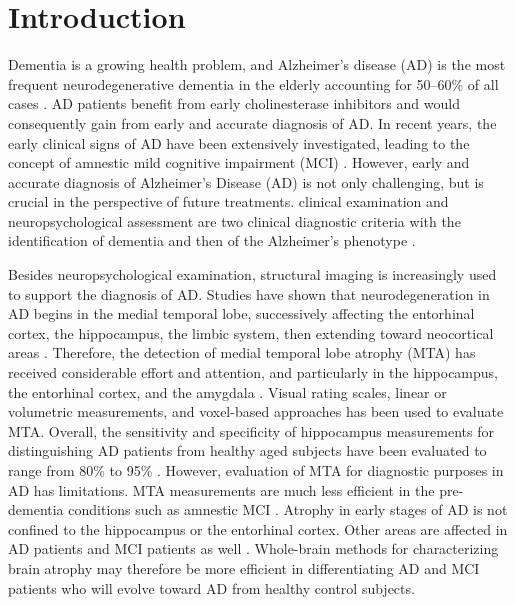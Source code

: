 
\section{Introduction}

Dementia is a growing health problem, and Alzheimer’s disease (AD) is the most frequent neurodegenerative dementia in the elderly accounting for 50–60\% of all cases \cite{brookmeyer1998projections,ferri2006global,ramaroson2003prevalence}. AD patients benefit from early cholinesterase inhibitors \cite{winblad1999assessing,dekosky2003looking} and would consequently gain from early and accurate diagnosis of AD. In recent years, the early clinical signs of AD have been extensively investigated, leading to the concept of amnestic
mild cognitive impairment (MCI) \cite{petersen2004mild,winblad2004mild}. However, early and accurate diagnosis of Alzheimer's Disease (AD) is not only challenging, but is crucial in the perspective of future treatments. clinical examination and neuropsychological assessment are two clinical diagnostic criteria with the identification of dementia and then of the Alzheimer's phenotype \cite{glodzik2012alzheimer}.

Besides neuropsychological examination, structural imaging is increasingly used to support the diagnosis of AD. Studies have shown that neurodegeneration in AD begins in the medial temporal lobe, successively affecting the entorhinal cortex, the hippocampus, the limbic system, then extending toward neocortical areas \cite{braak1995staging}. Therefore, the detection of medial temporal lobe atrophy (MTA) has received considerable effort and attention, and particularly in the hippocampus, the entorhinal cortex, and the amygdala \cite{leite2004pathological,glodzik2005role}. Visual rating scales, linear or volumetric measurements, and voxel-based approaches has been used to evaluate MTA. Overall, the sensitivity and specificity of hippocampus measurements for distinguishing AD patients from healthy aged subjects have been evaluated to range from 80\% to 95\% \cite{xu2000usefulness,frisoni1999hippocampal,laakso1998mri,lehericy1994amygdalohippocampal,jack1992mr}. However, evaluation of MTA for diagnostic purposes in AD has limitations. MTA measurements are much less efficient in the pre-dementia conditions such as amnestic MCI \cite{xu2000usefulness,pennanen2004hippocampus,de2001hippocampal,convit1997specific}. Atrophy in early stages of AD is not confined to the hippocampus or the entorhinal cortex. Other areas are affected in AD patients and MCI patients as well \cite{ael2003early}. Whole-brain methods for characterizing brain atrophy may therefore be more efficient in differentiating AD and MCI patients who will evolve toward AD from healthy control subjects. 

